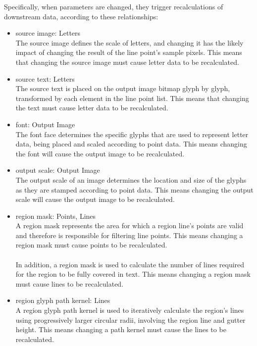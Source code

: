 Specifically, when parameters are changed, they trigger recalculations of downstream data, according to these relationships:
\begin{itemize}
      \item source image: Letters \\
            The source image defines the scale of letters, and changing it has the likely impact of changing the result of the line point's sample pixels.
            This means that changing the source image must cause letter data to be recalculated.

      \item source text: Letters \\
            The source text is placed on the output image bitmap glyph by glyph, transformed by each element in the line point list.
            This means that changing the text must cause letter data to be recalculated.

      \item font: Output Image \\
            The font face determines the specific glyphs that are used to represent letter data, being placed and scaled according to point data.
            This means changing the font will cause the output image to be recalculated.

      \item output scale: Output Image \\
            The output scale of an image determines the location and size of the glyphs as they are stamped according to point data.
            This means changing the output scale will cause the output image to be recalculated.

      \item region mask: Points, Lines \\
            A region mask represents the area for which a region line's points are valid and therefore is responsible for filtering line points.
            This means changing a region mask must cause points to be recalculated. \\
            \\
            In addition, a region mask is used to calculate the number of lines required for the region to be fully covered in text.
            This means changing a region mask must cause lines to be recalculated.


      \item region glyph path kernel: Lines \\
            A region glyph path kernel is used to iteratively calculate the region's lines using progressively larger circular radii, involving the region line and gutter height.
            This means changing a path kernel must cause the lines to be recalculated.


\end{itemize}
